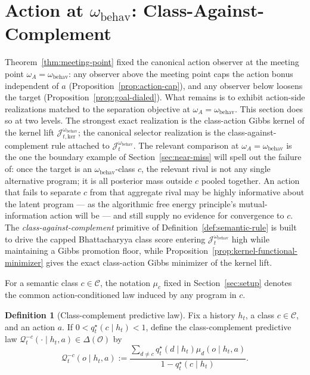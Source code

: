 \documentclass[11pt]{article}
\theoremstyle{definition}
\newtheorem{definition}[theorem]{Definition}
\theoremstyle{remark}
\newcommand{\Ccal}{\mathcal{C}}
\newcommand{\Ocal}{\mathcal{O}}
\newcommand{\Qcal}{\mathcal{Q}}
\begin{document}
\section{Action at $\omega_{\mathrm{behav}}$: Class-Against-Complement}
\label{sec:semantic-action}

Theorem~\ref{thm:meeting-point} fixed the canonical action observer at the meeting point $\omega_A=\omega_{\mathrm{behav}}$: any observer above the meeting point caps the action bonus independent of $a$ (Proposition~\ref{prop:action-cap}), and any observer below loosens the target (Proposition~\ref{prop:goal-dialed}). What remains is to exhibit action-side realizations matched to the separation objective at $\omega_A=\omega_{\mathrm{behav}}$. This section does so at two levels. The strongest exact realization is the class-action Gibbs kernel of the kernel lift $\mathcal J_{t,\mathrm{ker}}^{\omega_{\mathrm{behav}}}$; the canonical selector realization is the class-against-complement rule attached to $\mathcal J_t^{\omega_{\mathrm{behav}}}$. The relevant comparison at $\omega_A=\omega_{\mathrm{behav}}$ is the one the boundary example of Section~\ref{sec:near-miss} will spell out the failure of: once the target is an $\omega_{\mathrm{behav}}$-class $c$, the relevant rival is not any single alternative program; it is all posterior mass outside $c$ pooled together. An action that fails to separate $c$ from that aggregate rival may be highly informative about the latent program --- as the algorithmic free energy principle's mutual-information action will be --- and still supply no evidence for convergence to $c$. The \emph{class-against-complement} primitive of Definition~\ref{def:semantic-rule} is built to drive the capped Bhattacharyya class score entering $\mathcal J_t^{\omega_{\mathrm{behav}}}$ high while maintaining a Gibbs promotion floor, while Proposition~\ref{prop:kernel-functional-minimizer} gives the exact class-action Gibbs minimizer of the kernel lift.

For a semantic class $c\in\Ccal$, the notation $\mu_c$ fixed in Section~\ref{sec:setup} denotes the common action-conditioned law induced by any program in $c$.

\begin{definition}[Class-complement predictive law]
\label{def:class-complement}
Fix a history $h_t$, a class $c\in\Ccal$, and an action $a$. If $0<q_t^\star(c\mid h_t)<1$, define the class-complement predictive law $\Qcal_t^{-c}(\cdot\mid h_t,a)\in\Delta(\Ocal)$ by
\[
\Qcal_t^{-c}(o\mid h_t,a)
:=
\frac{\sum_{d\neq c} q_t^\star(d\mid h_t)\mu_d(o\mid h_t,a)}
{1-q_t^\star(c\mid h_t)}.
\]
\end{definition}
\end{document}
